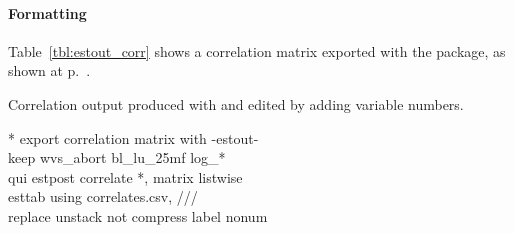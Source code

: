 %
\paragraph{Formatting}%
  Table~\ref{tbl:estout_corr} shows a correlation matrix exported with the  package, as shown at p.~\pageref{tbl:correlate_export}.%

\begin{fullwidth}
	\begin{table}
		\footnotesize
    
		\caption{Correlation output produced with  and edited by adding variable numbers.}
		\label{tbl:estout_corr}
	\end{table}
\end{fullwidth}

\begin{docspec}
  * export correlation matrix with -estout-\\
  keep wvs\_abort bl\_lu\_25mf log\_*\\
  qui estpost correlate *, matrix listwise\\
  esttab using correlates.csv, ///\\%
    replace unstack not compress label nonum
\end{docspec}

